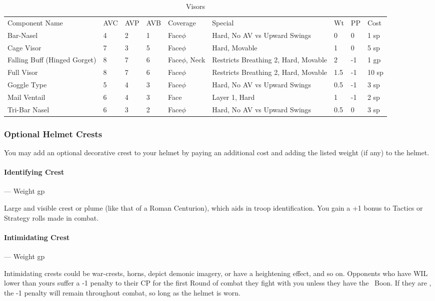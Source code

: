 \documentclass[oneside,11pt,english]{book}
\begin{document}
\begin{longtabu} to 
	\caption{Visors}
	\label{tab:Visors}\\
Component Name&AVC&AVP&AVB& Coverage& Special& Wt&PP&Cost\\
Bar-Nasel& 4& 2& 1& Face$\phi$& Hard, No AV vs Upward Swings &0& 0& 1 sp\\
Cage Visor& 7& 3& 5& Face$\phi$& Hard, Movable& 1& 0& 5 sp\\
Falling Buff 
(Hinged Gorget)& 8& 7& 6& Face$\phi$, Neck& Restricts Breathing 2, Hard, 
Movable& 2 &-1& 1 gp\\
Full Visor& 8& 7& 6& Face$\phi$& Restricts Breathing 2, Hard, 
Movable& 1.5 &-1& 10 sp\\
Goggle Type& 5& 4& 3& Face$\phi$& Hard, No AV vs Upward Swings &0.5 &-1& 3 sp\\
Mail Ventail& 6& 4& 3& Face& Layer 1, Hard& 1 &-1& 2 sp\\
Tri-Bar Nasel& 6& 3& 2& Face$\phi$& Hard, No AV vs Upward Swings &0.5& 0& 3 sp\\
\end{longtabu}

\subsubsection{Optional Helmet Crests}
You may add an optional decorative crest to your helmet by paying an additional cost and adding the listed weight (if any) to the helmet.

\vspace*{-10pt}\paragraph{Identifying Crest}--- Weight  gp\par
Large and visible crest or plume (like that of a Roman Centurion), which aids in troop identification. You gain a +1 bonus to Tactics or Strategy rolls made in combat.

\vspace*{-10pt}\paragraph{Intimidating Crest}--- Weight  gp\par
Intimidating crests could be war-crests, horns, depict demonic imagery, or have a 
heightening effect, and so on. Opponents who have WIL lower than yours suffer a -1 
penalty to their CP for the first Round of combat they fight with you unless they have 
the ~Boon. If they are , the -1 penalty will remain throughout combat, so long as the helmet is worn. 
\end{document}
